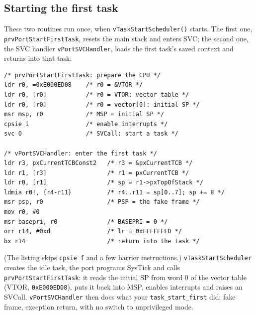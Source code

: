 \subsection{Starting the first task}
These two routines run once, when \texttt{vTaskStartScheduler()} starts. The first one, \texttt{prvPortStartFirstTask}, resets the main stack and enters SVC; the second one, the SVC handler \texttt{vPortSVCHandler}, loads the first task's saved context and returns into that task:
\begin{lstlisting}[basicstyle=\ttfamily\scriptsize]
/* prvPortStartFirstTask: prepare the CPU */
ldr r0, =0xE000ED08    /* r0 = &VTOR */
ldr r0, [r0]           /* r0 = VTOR: vector table */
ldr r0, [r0]           /* r0 = vector[0]: initial SP */
msr msp, r0            /* MSP = initial SP */
cpsie i                /* enable interrupts */
svc 0                  /* SVCall: start a task */

/* vPortSVCHandler: enter the first task */
ldr r3, pxCurrentTCBConst2   /* r3 = &pxCurrentTCB */
ldr r1, [r3]                 /* r1 = pxCurrentTCB */
ldr r0, [r1]                 /* sp = r1->pxTopOfStack */
ldmia r0!, {r4-r11}          /* r4..r11 = sp[0..7]; sp += 8 */
msr psp, r0                  /* PSP = the fake frame */
mov r0, #0
msr basepri, r0              /* BASEPRI = 0 */
orr r14, #0xd                /* lr = 0xFFFFFFFD */
bx r14                       /* return into the task */
\end{lstlisting}
(The listing skips \texttt{cpsie f} and a few barrier instructions.) \texttt{vTaskStartScheduler} creates the idle task, the port programs SysTick and calls \texttt{prvPortStartFirstTask}: it reads the initial SP from word 0 of the vector table (VTOR, \texttt{0xE000ED08}), puts it back into MSP, enables interrupts and raises an SVCall. \texttt{vPortSVCHandler} then does what your \texttt{task\_start\_first} did: fake frame, exception return, with no switch to unprivileged mode.

